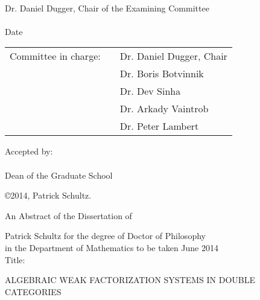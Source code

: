 \documentclass[11pt,draft]{UOthesis}
\begin{document}
	{\singlespace
	\underline{\hspace*{5in}} \\
	Dr. Daniel Dugger, 	%
	Chair of the Examining Committee \\[36pt]
	\underline{\hspace*{3in}}\\
	 Date \\[36pt]
 
 
	 \begin{tabular}{lcl}
	\hspace*{-1em}    %
	 Committee in charge: & \hspace*{.5in}
	 	& Dr. Daniel Dugger, Chair\\
	 	&& Dr. Boris Botvinnik\\
	 	&& Dr. Dev Sinha\\
	 	&& Dr. Arkady Vaintrob\\
	 	&& Dr. Peter Lambert\\[24pt]
	\end{tabular}

	Accepted by: \\[36pt]
	\underline{\hspace*{5in}}\\
		Dean of the Graduate School
	}
	\newpage



\vspace*{1.5in}
\begin{center}
\copyright 2014, Patrick Schultz.%
\end{center}
\newpage


	\TOP

	\begin{center}
	An Abstract of the Dissertation of \\
	\end{center}
	Patrick Schultz %
	  	\hfill	for the degree of	\hfill Doctor of Philosophy\\ 
	in the Department of Mathematics \hfill to be taken \hfill 
	June 2014 \\ %
	Title: \parbox[t]{5.4in}{ALGEBRAIC WEAK FACTORIZATION SYSTEMS IN DOUBLE CATEGORIES} \\[9pt]
\end{document}
